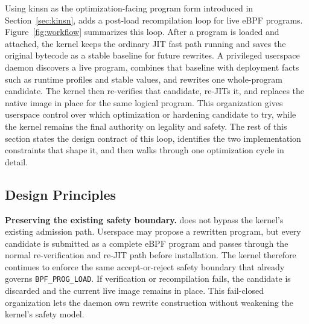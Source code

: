 

Using kinsn as the optimization-facing program form introduced in Section~\ref{sec:kinsn}, \tool adds a post-load recompilation loop for live eBPF programs. Figure~\ref{fig:workflow} summarizes this loop. After a program is loaded and attached, the kernel keeps the ordinary JIT fast path running and saves the original bytecode as a stable baseline for future rewrites. A privileged userspace daemon discovers a live program, combines that baseline with deployment facts such as runtime profiles and stable values, and rewrites one whole-program candidate. The kernel then re-verifies that candidate, re-JITs it, and replaces the native image in place for the same logical program. This organization gives userspace control over which optimization or hardening candidate to try, while the kernel remains the final authority on legality and safety. The rest of this section states the design contract of this loop, identifies the two implementation constraints that shape it, and then walks through one optimization cycle in detail.



\subsection{Design Principles}
\label{sec:rejit-principles}

\noindent\textbf{Preserving the existing safety boundary.}
\tool does not bypass the kernel's existing admission path. Userspace may propose a rewritten program, but every candidate is submitted as a complete eBPF program and passes through the normal re-verification and re-JIT path before installation. The kernel therefore continues to enforce the same accept-or-reject safety boundary that already governs \texttt{BPF\_PROG\_LOAD}. If verification or recompilation fails, the candidate is discarded and the current live image remains in place. This fail-closed organization lets the daemon own rewrite construction without weakening the kernel's safety model.

